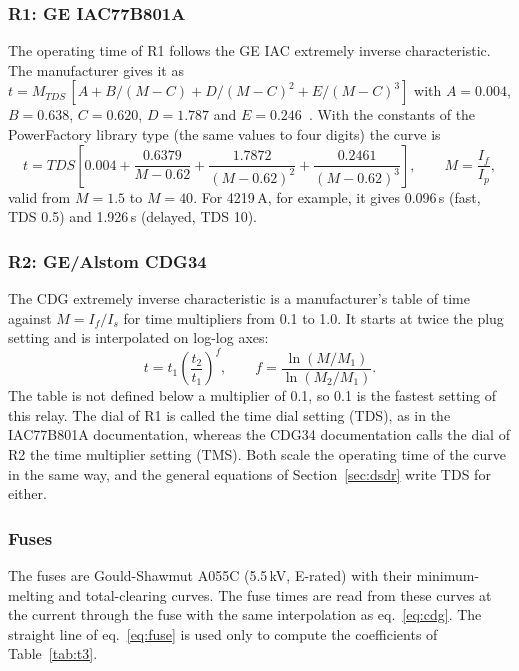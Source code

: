 \documentclass[12pt,a4paper]{article}
\newcommand{\PF}{PowerFactory}
\begin{document}
\subsubsection{R1: GE IAC77B801A}
The operating time of R1 follows the GE IAC extremely inverse characteristic. The manufacturer gives it as
$t = M_{TDS}\,[A + B/(M-C) + D/(M-C)^2 + E/(M-C)^3]$ with $A = 0.004$, $B = 0.638$, $C = 0.620$, $D = 1.787$
and $E = 0.246$~\cite{gemultilin}. With the constants of the \PF{} library type (the same values to four
digits) the curve is
\begin{equation}
t = TDS\left[0.004+\frac{0.6379}{M-0.62}+\frac{1.7872}{(M-0.62)^2}+\frac{0.2461}{(M-0.62)^3}\right],
\qquad M=\frac{I_f}{I_p},
\label{eq:iac}
\end{equation}
valid from $M=1.5$ to $M=40$. For 4219\,A, for example, it gives 0.096\,s (fast, TDS 0.5) and 1.926\,s
(delayed, TDS 10).

\subsubsection{R2: GE/Alstom CDG34}
The CDG extremely inverse characteristic is a manufacturer's table of time against $M=I_f/I_s$ for time
multipliers from 0.1 to 1.0. It starts at twice the plug setting and is interpolated on log-log axes:
\begin{equation}
t = t_1\left(\frac{t_2}{t_1}\right)^{f},\qquad f=\frac{\ln(M/M_1)}{\ln(M_2/M_1)} .
\label{eq:cdg}
\end{equation}
The table is not defined below a multiplier of 0.1, so 0.1 is the fastest setting of this relay.
The dial of R1 is called the time dial setting (TDS), as in the IAC77B801A documentation, whereas the CDG34
documentation calls the dial of R2 the time multiplier setting (TMS). Both scale the operating time of the
curve in the same way, and the general equations of Section~\ref{sec:dsdr} write TDS for either.

\subsubsection{Fuses}
The fuses are Gould-Shawmut A055C (5.5\,kV, E-rated) with their minimum-melting and total-clearing curves.
The fuse times are read from these curves at the current through the fuse with the same interpolation as
eq.~\eqref{eq:cdg}. The straight line of eq.~\eqref{eq:fuse} is used only to compute the coefficients of
Table~\ref{tab:t3}.
\end{document}
